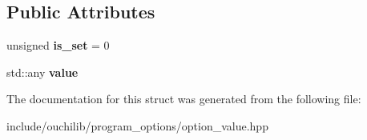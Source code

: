 \subsection*{Public Attributes}
\begin{DoxyCompactItemize}
\item 
\mbox{\label{structouchi_1_1program__options_1_1detail_1_1option__info_3_01_char_t_00_01single__value_3_01_t_01_4_00_01_traits_01_4_a8499c752cc518d677c1e7901db067c9b}} 
unsigned {\bfseries is\+\_\+set} = 0
\item 
\mbox{\label{structouchi_1_1program__options_1_1detail_1_1option__info_3_01_char_t_00_01single__value_3_01_t_01_4_00_01_traits_01_4_abd3b9dabdbfa75e49b27e4506adbce1e}} 
std\+::any {\bfseries value}
\end{DoxyCompactItemize}


The documentation for this struct was generated from the following file\+:\begin{DoxyCompactItemize}
\item 
include/ouchilib/program\+\_\+options/option\+\_\+value.\+hpp\end{DoxyCompactItemize}
